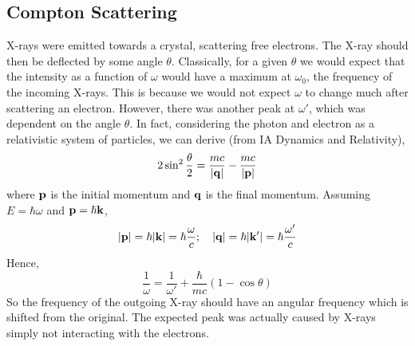 \subsection{Compton Scattering}
X-rays were emitted towards a crystal, scattering free electrons.
The X-ray should then be deflected by some angle \( \theta \).
Classically, for a given \( \theta \) we would expect that the intensity as a function of \( \omega \) would have a maximum at \( \omega_0 \), the frequency of the incoming X-rays.
This is because we would not expect \( \omega \) to change much after scattering an electron.
However, there was another peak at \( \omega' \), which was dependent on the angle \( \theta \).
In fact, considering the photon and electron as a relativistic system of particles, we can derive (from IA Dynamics and Relativity),
\[
	2 \sin^2 \frac{\theta}{2} = \frac{mc}{\abs{\vb q}} - \frac{mc}{\abs{\vb p}}
\]
where \( \vb p \) is the initial momentum and \( \vb q \) is the final momentum.
Assuming \( E = \hbar \omega \) and \( \vb p = \hbar \vb k \),
\[
	\abs{\vb p} = \hbar \abs{\vb k} = \hbar \frac{\omega}{c};\quad \abs{\vb q} = \hbar \abs{\vb k'} = \hbar\frac{\omega'}{c}
\]
Hence,
\[
	\frac{1}{\omega} = \frac{1}{\omega'} + \frac{\hbar}{mc}(1-\cos\theta)
\]
So the frequency of the outgoing X-ray should have an angular frequency which is shifted from the original.
The expected peak was actually caused by X-rays simply not interacting with the electrons.

